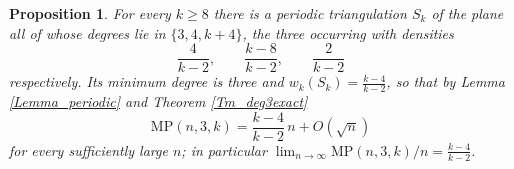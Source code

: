 \documentclass[10pt,a4paper]{article}
\newtheorem{proposition}[theorem]{Proposition}
\begin{document}


\begin{proposition}
\label{Prop_deg3}For every $k\geq 8$ there is a periodic triangulation $S_{k}$ of the plane all of whose degrees
lie in $\{3,4,k+4\}$, the three occurring with densities
\[
\frac{4}{k-2},\qquad \frac{k-8}{k-2},\qquad \frac{2}{k-2}
\]
respectively. Its minimum degree is three and $w_{k}(S_{k})=\frac{k-4}{k-2}$, so that by Lemma
\ref{Lemma_periodic} and Theorem \ref{Tm_deg3exact}
\[
\mathrm{MP}(n,3,k)=\frac{k-4}{k-2}\,n+O(\sqrt{n})
\]
for every sufficiently large $n$; in particular $\lim_{n\to \infty }\mathrm{MP}(n,3,k)/n=\frac{k-4}{k-2}$.
\end{proposition}
\end{document}
